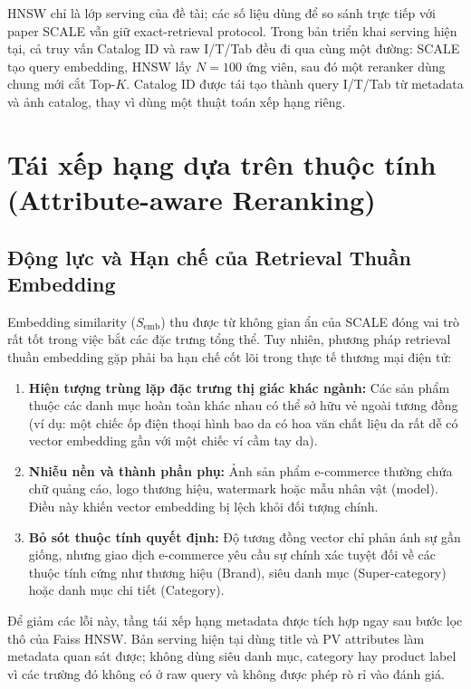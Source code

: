 \documentclass[10pt,conference]{IEEEtran}
\begin{document}
HNSW chỉ là lớp serving của đề tài; các số liệu dùng để so sánh trực tiếp với paper SCALE vẫn giữ exact-retrieval protocol. Trong bản triển khai serving hiện tại, cả truy vấn Catalog ID và raw I/T/Tab đều đi qua cùng một đường: SCALE tạo query embedding, HNSW lấy $N=100$ ứng viên, sau đó một reranker dùng chung mới cắt Top-$K$. Catalog ID được tái tạo thành query I/T/Tab từ metadata và ảnh catalog, thay vì dùng một thuật toán xếp hạng riêng.


\section{Tái xếp hạng dựa trên thuộc tính (Attribute-aware Reranking)}

\subsection{Động lực và Hạn chế của Retrieval Thuần Embedding}

Embedding similarity ($S_{\mathrm{emb}}$) thu được từ không gian ẩn của SCALE đóng vai trò rất tốt trong việc bắt các đặc trưng tổng thể. Tuy nhiên, phương pháp retrieval thuần embedding gặp phải ba hạn chế cốt lõi trong thực tế thương mại điện tử:
\begin{enumerate}[leftmargin=*]
    \item \textbf{Hiện tượng trùng lặp đặc trưng thị giác khác ngành:} Các sản phẩm thuộc các danh mục hoàn toàn khác nhau có thể sở hữu vẻ ngoài tương đồng (ví dụ: một chiếc ốp điện thoại hình bao da có hoa văn chất liệu da rất dễ có vector embedding gần với một chiếc ví cầm tay da).
    \item \textbf{Nhiễu nền và thành phần phụ:} Ảnh sản phẩm e-commerce thường chứa chữ quảng cáo, logo thương hiệu, watermark hoặc mẫu nhân vật (model). Điều này khiến vector embedding bị lệch khỏi đối tượng chính.
    \item \textbf{Bỏ sót thuộc tính quyết định:} Độ tương đồng vector chỉ phản ánh sự gần giống, nhưng giao dịch e-commerce yêu cầu sự chính xác tuyệt đối về các thuộc tính cứng như thương hiệu (Brand), siêu danh mục (Super-category) hoặc danh mục chi tiết (Category).
\end{enumerate}

Để giảm các lỗi này, tầng tái xếp hạng metadata được tích hợp ngay sau bước lọc thô của Faiss HNSW. Bản serving hiện tại dùng title và PV attributes làm metadata quan sát được; không dùng siêu danh mục, category hay product label vì các trường đó không có ở raw query và không được phép rò rỉ vào đánh giá.
\end{document}
